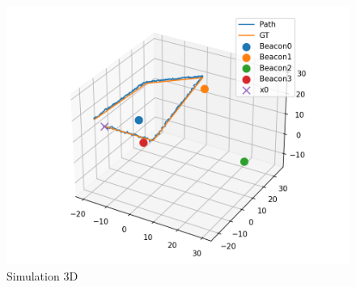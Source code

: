 \begin{figure}[H]
    \centering
    \includegraphics[width=.75\linewidth]{figures/sim_3d_path.png}
    \caption{Simulation 3D}
    \label{fig:sim_3d}
\end{figure}
